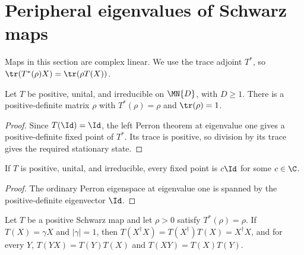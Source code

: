 \section{Peripheral eigenvalues of Schwarz maps}

Maps in this section are complex linear. We use the trace adjoint $T^*$, so
$\tr(T^*(\rho)X)=\tr(\rho T(X))$.

\begin{theorem}
    \label{thm:schwarz_faithful_adjoint_state}
    \leanok
    Let $T$ be positive, unital, and irreducible on $\MN{D}$, with $D\geq1$.
    There is a positive-definite matrix $\rho$ with
    $T^*(\rho)=\rho$ and $\tr(\rho)=1$.
\end{theorem}

\begin{proof}\leanok
    Since $T(\Id)=\Id$, the left Perron theorem at eigenvalue one gives a
    positive-definite fixed point of $T^*$. Its trace is positive, so division
    by its trace gives the required stationary state.
\end{proof}

\begin{theorem}
    \label{thm:schwarz_scalar_fixed_points}
    \leanok
    If $T$ is positive, unital, and irreducible, every fixed point is $c\Id$
    for some $c\in\C$.
\end{theorem}

\begin{proof}\leanok
    The ordinary Perron eigenspace at eigenvalue one is spanned by the
    positive-definite eigenvector $\Id$.
\end{proof}

\begin{theorem}
    \label{thm:schwarz_peripheral_domain}
    \leanok
    Let $T$ be a positive Schwarz map and let $\rho>0$ satisfy
    $T^*(\rho)=\rho$. If $T(X)=\gamma X$ and $|\gamma|=1$, then
    $T(X^\dagger X)=T(X^\dagger)T(X)=X^\dagger X$, and for every $Y$,
    $T(YX)=T(Y)T(X)$ and $T(XY)=T(X)T(Y)$.
\end{theorem}

